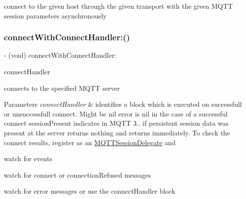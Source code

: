 connect to the given host through the given transport with the given M\+Q\+TT session parameters asynchronously \mbox{\label{interface_m_q_t_t_session_af2fb37adbbf9eeb28cea7dab43297fd7}} 
\subsubsection{\texorpdfstring{connect\+With\+Connect\+Handler\+:()}{connectWithConnectHandler:()}}
{\footnotesize\ttfamily -\/ (void) connect\+With\+Connect\+Handler\+: \begin{DoxyParamCaption}\item[{(M\+Q\+T\+T\+Connect\+Handler)}]{connect\+Handler }\end{DoxyParamCaption}}

connects to the specified M\+Q\+TT server


\begin{DoxyParams}{Parameters}
{\em connect\+Handler} & identifies a block which is executed on successfull or unsuccessfull connect. Might be nil error is nil in the case of a successful connect session\+Present indicates in M\+Q\+TT 3.. if persistent session data was present at the server returns nothing and returns immediately. To check the connect results, register as an \hyperlink{class_m_q_t_t_session_delegate-p}{M\+Q\+T\+T\+Session\+Delegate} and
\begin{DoxyItemize}
\item watch for events
\item watch for connect or connection\+Refused messages
\item watch for error messages or use the connect\+Handler block
\end{DoxyItemize}\\
\hline
\end{DoxyParams}

 \mbox{\label{interface_m_q_t_t_session_aef2d0980b561184800908e95dd3a9fc7}} 
